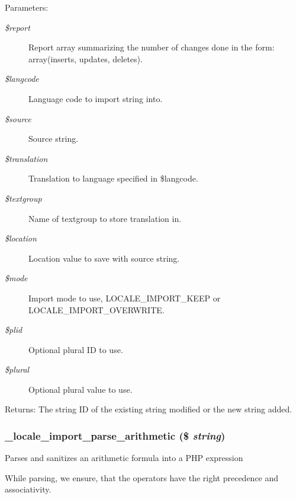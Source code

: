 \begin{Desc}
\item[Parameters:]
\begin{description}
\item[{\em \$report}]Report array summarizing the number of changes done in the form: array(inserts, updates, deletes). \item[{\em \$langcode}]Language code to import string into. \item[{\em \$source}]Source string. \item[{\em \$translation}]Translation to language specified in \$langcode. \item[{\em \$textgroup}]Name of textgroup to store translation in. \item[{\em \$location}]Location value to save with source string. \item[{\em \$mode}]Import mode to use, LOCALE\_\-IMPORT\_\-KEEP or LOCALE\_\-IMPORT\_\-OVERWRITE. \item[{\em \$plid}]Optional plural ID to use. \item[{\em \$plural}]Optional plural value to use. \end{description}
\end{Desc}
\begin{Desc}
\item[Returns:]The string ID of the existing string modified or the new string added. \end{Desc}
\hypertarget{group__locale_gfec8dc8c1a6f8a0c70b5280c3a520c63}{
\subsubsection[{\_\-locale\_\-import\_\-parse\_\-arithmetic}]{\setlength{\rightskip}{0pt plus 5cm}\_\-locale\_\-import\_\-parse\_\-arithmetic (\$ {\em string})}}
\label{group__locale_gfec8dc8c1a6f8a0c70b5280c3a520c63}


Parses and sanitizes an arithmetic formula into a PHP expression

While parsing, we ensure, that the operators have the right precedence and associativity.

